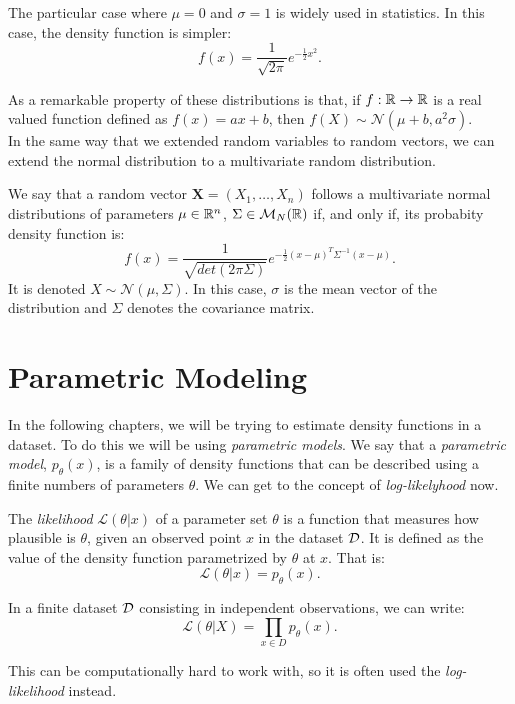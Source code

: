 The particular case where $\mu = 0$ and $\sigma = 1$ is widely used in statistics. In this case, the density function is simpler:
\[
f(x) = \frac{1}{\sqrt{2\pi}}e^{-\frac{1}{2}x^2}.
\]

As a remarkable property of these distributions is that, if $f : \mathbb{R} \to \mathbb{R}$ is a real valued function defined 
as $f(x) = ax+b$, then $f(X) \sim \mathcal N (\mu + b, a^2 \sigma)$.\\

In the same way that we extended random variables to random vectors, we can extend the normal distribution to a multivariate
random distribution.

\begin{ndef}
We say that a random vector $\bm{X} = (X_1,\dots,X_n)$ follows a multivariate normal distributions of parameters
$\mu \in \mathbb{R}^n$, $\Sigma \in \mathcal M_N(\mathbb{R})$ if, and only if, its probabity density function is:
\[
f(x) = \frac{1}{\sqrt{det(2\pi \Sigma)}}e^{-\frac{1}{2}(x - \mu )^T \Sigma^{-1} (x-\mu)}.
\]
It is denoted $X \sim \mathcal N(\mu, \Sigma)$.
In this case, $\sigma$ is the mean vector of the distribution and $\Sigma$ denotes the covariance matrix.  
\end{ndef}


\section{Parametric Modeling}

In the following chapters, we will be trying to estimate density functions in a dataset. To do this we will be using \emph{parametric models}. We say that a \emph{parametric model}, $p_\theta(x)$, 
is a family of density functions that can be described using a finite numbers of parameters $\theta$. We can get to the concept of \emph{log-likelyhood} now.

\begin{ndef}
The \emph{likelihood} $\mathcal L(\theta | x)$ of a parameter set $\theta$ is a function that measures how plausible is $\theta$, given an observed point $x$ in the dataset $\mathcal{D}$. It is defined as the value of the 
density function parametrized by $\theta$ at $x$. That is:
$$
\mathcal L(\theta|x) = p_\theta(x).
$$
\end{ndef}

In a finite dataset $\mathcal{D}$ consisting in independent observations, we can write:
\[
\mathcal L(\theta | X) = \prod_{x \in D} p_\theta(x).
\]

This can be computationally hard to work with, so it is often used the \emph{log-likelihood} instead.

